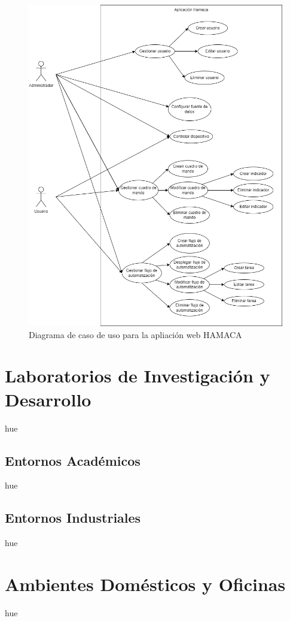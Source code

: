 \begin{figure}[htb]
\centering
\includegraphics[scale=0.35]{./Figuras/caso_de_uso.png}
\caption{Diagrama de caso de uso para la apliación web HAMACA}
\label{fig:caso_de_uso}
\vspace*{-10pt}
\end{figure}


\section{Laboratorios de Investigación y Desarrollo}
hue
\subsection{Entornos Académicos}
hue
\subsection{Entornos Industriales}
hue

\section{Ambientes Domésticos y Oficinas}
hue
